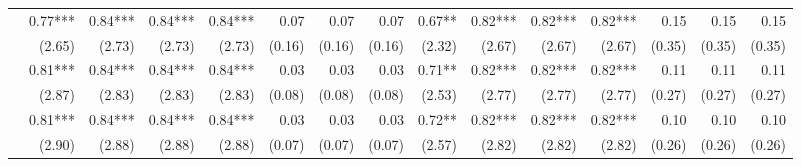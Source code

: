 \begin{tabularx}{1.45\textwidth}{lRRRRRRRRRRRRRR}
		 & \num{0.77}***\phantom{)} & \num{0.84}***\phantom{)} & \num{0.84}***\phantom{)} & \num{0.84}***\phantom{)} & \num{0.07}\phantom{***)} & \num{0.07}\phantom{***)} & \num{0.07}\phantom{***)} & \num{0.67}**\phantom{*)} & \num{0.82}***\phantom{)} & \num{0.82}***\phantom{)} & \num{0.82}***\phantom{)} & \num{0.15}\phantom{***)} & \num{0.15}\phantom{***)} & \num{0.15}\phantom{***)} \\
		 & (\num{2.65})\phantom{***} & (\num{2.73})\phantom{***} & (\num{2.73})\phantom{***} & (\num{2.73})\phantom{***} & (\num{0.16})\phantom{***} & (\num{0.16})\phantom{***} & (\num{0.16})\phantom{***} & (\num{2.32})\phantom{***} & (\num{2.67})\phantom{***} & (\num{2.67})\phantom{***} & (\num{2.67})\phantom{***} & (\num{0.35})\phantom{***} & (\num{0.35})\phantom{***} & (\num{0.35})\phantom{***} \\ [\dspacing]
		 & \num{0.81}***\phantom{)} & \num{0.84}***\phantom{)} & \num{0.84}***\phantom{)} & \num{0.84}***\phantom{)} & \num{0.03}\phantom{***)} & \num{0.03}\phantom{***)} & \num{0.03}\phantom{***)} & \num{0.71}**\phantom{*)} & \num{0.82}***\phantom{)} & \num{0.82}***\phantom{)} & \num{0.82}***\phantom{)} & \num{0.11}\phantom{***)} & \num{0.11}\phantom{***)} & \num{0.11}\phantom{***)} \\
		 & (\num{2.87})\phantom{***} & (\num{2.83})\phantom{***} & (\num{2.83})\phantom{***} & (\num{2.83})\phantom{***} & (\num{0.08})\phantom{***} & (\num{0.08})\phantom{***} & (\num{0.08})\phantom{***} & (\num{2.53})\phantom{***} & (\num{2.77})\phantom{***} & (\num{2.77})\phantom{***} & (\num{2.77})\phantom{***} & (\num{0.27})\phantom{***} & (\num{0.27})\phantom{***} & (\num{0.27})\phantom{***} \\ [\dspacing]
		 & \num{0.81}***\phantom{)} & \num{0.84}***\phantom{)} & \num{0.84}***\phantom{)} & \num{0.84}***\phantom{)} & \num{0.03}\phantom{***)} & \num{0.03}\phantom{***)} & \num{0.03}\phantom{***)} & \num{0.72}**\phantom{*)} & \num{0.82}***\phantom{)} & \num{0.82}***\phantom{)} & \num{0.82}***\phantom{)} & \num{0.10}\phantom{***)} & \num{0.10}\phantom{***)} & \num{0.10}\phantom{***)} \\
		 & (\num{2.90})\phantom{***} & (\num{2.88})\phantom{***} & (\num{2.88})\phantom{***} & (\num{2.88})\phantom{***} & (\num{0.07})\phantom{***} & (\num{0.07})\phantom{***} & (\num{0.07})\phantom{***} & (\num{2.57})\phantom{***} & (\num{2.82})\phantom{***} & (\num{2.82})\phantom{***} & (\num{2.82})\phantom{***} & (\num{0.26})\phantom{***} & (\num{0.26})\phantom{***} & (\num{0.26})\phantom{***} \\ [\dspacing]

\end{tabularx}
